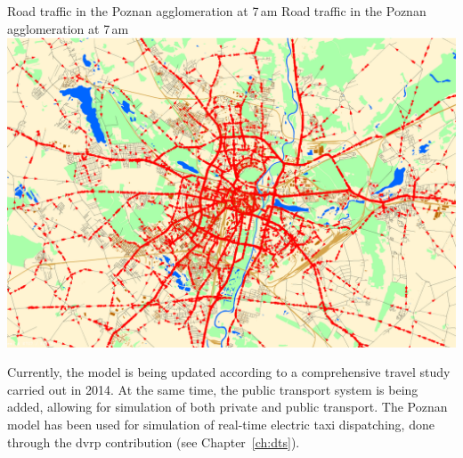 \createfigure%
{Road traffic in the Poznan agglomeration at 7\,am}%
{Road traffic in the Poznan agglomeration at 7\,am}%
{\label{fig:poznan_traffic_simulation}}%
{\includegraphics[width=\textwidth, angle=0]{scenarios/figures/poznan_traffic_simulation}}%
{}%

Currently, the model is being updated according to a comprehensive travel study carried out in 2014. At the same time, the public transport system is being added, allowing for simulation of both private and public transport. The Poznan model has been used for simulation of real-time electric taxi dispatching, done through the \gls{dvrp} \gls{contribution} (see Chapter~\ref{ch:dts}).

